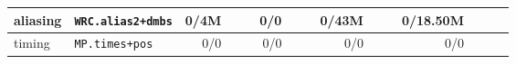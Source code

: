 \begin{tabular}{l l  | r r l | r r l | r r l | r r l l}
        aliasing &                                     \verb|WRC.alias2+dmbs| &           0/4M &                       &                   &            0/0 &                       &                 &          0/43M &                       &                   &       0/18.50M &                       &                   & \\ \hline 
          timing &                                        \verb|MP.times+pos| &            0/0 &                       &                   &            0/0 &                       &                 &            0/0 &                       &                   &            0/0 &                       &                   & \\ \hline 
\end{tabular}
